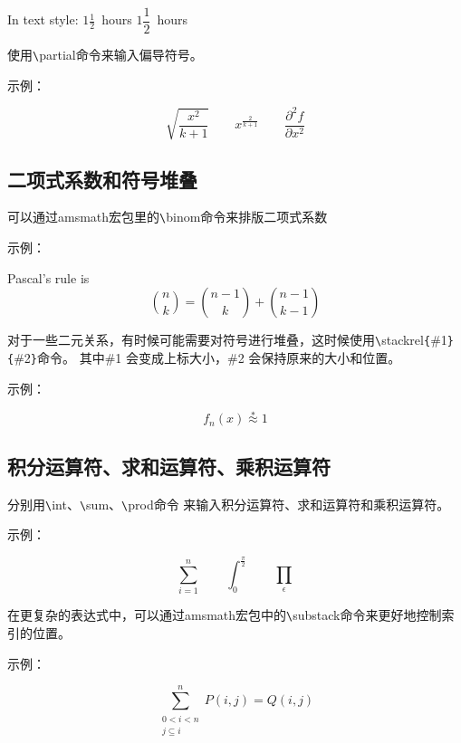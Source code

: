 \documentclass[UTF8]{ctexart}
\begin{document}
In text style:
$1\frac{1}{2}$~hours \qquad $1\dfrac{1}{2}$~hours

使用\texttt{\textbackslash}partial命令来输入偏导符号。

示例：

\begin{equation*}
  \sqrt{\frac{x^2}{k+1}}\qquad x^\frac{2}{k+1} \qquad
  \frac{\partial^2f}{\partial x^2}
\end{equation*}
\subsection{二项式系数和符号堆叠}
可以通过amsmath宏包里的\texttt{\textbackslash}binom命令来排版二项式系数

示例：

Pascal's rule is
\begin{equation*}
  \binom{n}{k}=\binom{n-1}{k}+\binom{n-1}{k-1}
\end{equation*}

对于一些二元关系，有时候可能需要对符号进行堆叠，这时候使用\texttt{\textbackslash}stackrel\texttt{\{}\#1\texttt{\}}\texttt{\{}\#2\texttt{\}}命令。
其中\#1 会变成上标大小，\#2 会保持原来的大小和位置。

示例：

\begin{equation*}
    f_n(x) \stackrel{*}{\approx} 1
\end{equation*}

\subsection{积分运算符、求和运算符、乘积运算符}
分别用\texttt{\textbackslash}int、\texttt{\textbackslash}sum、\texttt{\textbackslash}prod命令
来输入积分运算符、求和运算符和乘积运算符。

示例：

\begin{equation*}
  \sum_{i=1}^n \qquad \int_0^{\frac{\pi}{2}} \qquad \prod_\epsilon
\end{equation*}

在更复杂的表达式中，可以通过amsmath宏包中的\texttt{\textbackslash}substack命令来更好地控制索引的位置。

示例：

\begin{equation*}
  \sum^n_{\substack{0<i<n \\ j\subseteq i}} P(i,j) =  Q(i,j)
\end{equation*}
\end{document}

